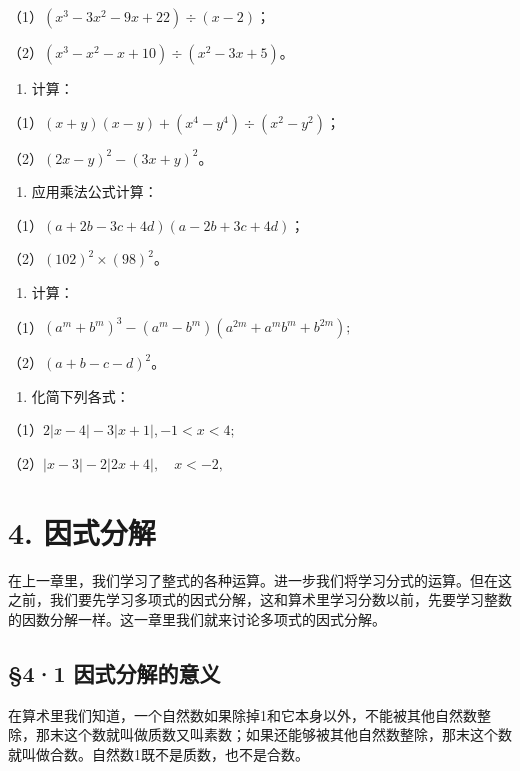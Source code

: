 （1）\((x^{3} - 3x^{2} - 9x + 22) \div (x - 2)\)；

（2）\((x^{3} - x^{2} - x + 10) \div (x^{2} - 3x + 5)\)。

\begin{enumerate}[start=7]
\item
  计算：
\end{enumerate}

（1）\((x + y)(x - y) + (x^4 - y^4) \div (x^2 - y^2)\)；

（2）\((2x - y)^{2} - (3x + y)^{2}\)。

\begin{enumerate}[start=8]
\item
  应用乘法公式计算：
\end{enumerate}

（1）\((a + 2b - 3c + 4d)(a - 2b + 3c + 4d)\)；

（2）\((102)^{2} \times (98)^{2}\)。

\begin{enumerate}[start=9]
\item
  计算：
\end{enumerate}

（1）\((a^{m} + b^{m})^{3} - (a^{m} - b^{m})(a^{2m} + a^{m}b^{m} + b^{2m});\)

（2）\((a + b - c - d)^2\)。

\begin{enumerate}[start=10]
\item
  化简下列各式：
\end{enumerate}

（1）\(2|x - 4| - 3|x + 1|, -1 < x < 4;\)

（2）\(|x-3|-2|2x+4|,\quad x<-2,\)

\chapter{4. 因式分解}

在上一章里，我们学习了整式的各种运算。进一步我们将学习分式的运算。但在这之前，我们要先学习多项式的因式分解，这和算术里学习分数以前，先要学习整数的因数分解一样。这一章里我们就来讨论多项式的因式分解。

\section{§4·1 因式分解的意义}

在算术里我们知道，一个自然数如果除掉1和它本身以外，不能被其他自然数整除，那末这个数就叫做质数又叫素数；如果还能够被其他自然数整除，那末这个数就叫做合数。自然数1既不是质数，也不是合数。


